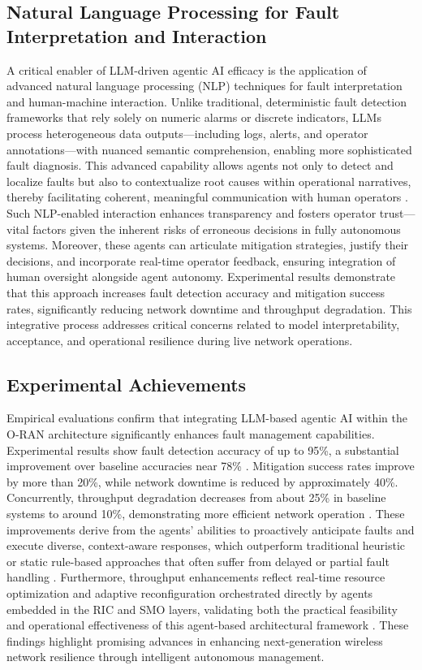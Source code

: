 \documentclass[sigconf]{acmart}
\begin{document}
\subsection{Natural Language Processing for Fault Interpretation and Interaction}

A critical enabler of LLM-driven agentic AI efficacy is the application of advanced natural language processing (NLP) techniques for fault interpretation and human-machine interaction. Unlike traditional, deterministic fault detection frameworks that rely solely on numeric alarms or discrete indicators, LLMs process heterogeneous data outputs—including logs, alerts, and operator annotations—with nuanced semantic comprehension, enabling more sophisticated fault diagnosis. This advanced capability allows agents not only to detect and localize faults but also to contextualize root causes within operational narratives, thereby facilitating coherent, meaningful communication with human operators \cite{ref55}. Such NLP-enabled interaction enhances transparency and fosters operator trust—vital factors given the inherent risks of erroneous decisions in fully autonomous systems. Moreover, these agents can articulate mitigation strategies, justify their decisions, and incorporate real-time operator feedback, ensuring integration of human oversight alongside agent autonomy. Experimental results demonstrate that this approach increases fault detection accuracy and mitigation success rates, significantly reducing network downtime and throughput degradation. This integrative process addresses critical concerns related to model interpretability, acceptance, and operational resilience during live network operations.

\subsection{Experimental Achievements}

Empirical evaluations confirm that integrating LLM-based agentic AI within the O-RAN architecture significantly enhances fault management capabilities. Experimental results show fault detection accuracy of up to 95\%, a substantial improvement over baseline accuracies near 78\% \cite{ref46,ref55,ref27}. Mitigation success rates improve by more than 20\%, while network downtime is reduced by approximately 40\%. Concurrently, throughput degradation decreases from about 25\% in baseline systems to around 10\%, demonstrating more efficient network operation \cite{ref55}. These improvements derive from the agents’ abilities to proactively anticipate faults and execute diverse, context-aware responses, which outperform traditional heuristic or static rule-based approaches that often suffer from delayed or partial fault handling \cite{ref27}. Furthermore, throughput enhancements reflect real-time resource optimization and adaptive reconfiguration orchestrated directly by agents embedded in the RIC and SMO layers, validating both the practical feasibility and operational effectiveness of this agent-based architectural framework \cite{ref55}. These findings highlight promising advances in enhancing next-generation wireless network resilience through intelligent autonomous management.
\end{document}
